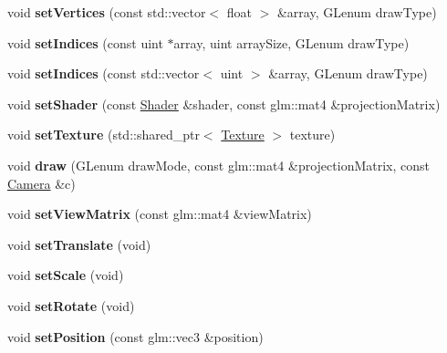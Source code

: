 \begin{DoxyCompactItemize}
void {\bfseries set\+Vertices} (const std\+::vector$<$ float $>$ \&array, G\+Lenum draw\+Type)
\item 
\mbox{\label{class_object_a84e6b296710f817596fa8ff7ad09d6ef}} 
void {\bfseries set\+Indices} (const uint $\ast$array, uint array\+Size, G\+Lenum draw\+Type)
\item 
\mbox{\label{class_object_a93b4e7330b5ccf3355fd53e202f5127c}} 
void {\bfseries set\+Indices} (const std\+::vector$<$ uint $>$ \&array, G\+Lenum draw\+Type)
\item 
\mbox{\label{class_object_ace74c7c5c63465778a46208f3f8aa708}} 
void {\bfseries set\+Shader} (const \hyperlink{class_shader}{Shader} \&shader, const glm\+::mat4 \&projection\+Matrix)
\item 
\mbox{\label{class_object_af1040cb216f7ca9db4c9578438949765}} 
void {\bfseries set\+Texture} (std\+::shared\+\_\+ptr$<$ \hyperlink{class_texture}{Texture} $>$ texture)
\item 
\mbox{\label{class_object_a15a01f840e0d23dcb531dc3e11db48c8}} 
void {\bfseries draw} (G\+Lenum draw\+Mode, const glm\+::mat4 \&projection\+Matrix, const \hyperlink{class_camera}{Camera} \&c)
\item 
\mbox{\label{class_object_ac9ec1252fbc5ed5f0e939327c49502df}} 
void {\bfseries set\+View\+Matrix} (const glm\+::mat4 \&view\+Matrix)
\item 
\mbox{\label{class_object_add03115634ae6d9b2e7b3f60b7e18fb7}} 
void {\bfseries set\+Translate} (void)
\item 
\mbox{\label{class_object_a47499992846ea51d38c619ed8198692d}} 
void {\bfseries set\+Scale} (void)
\item 
\mbox{\label{class_object_ae938828b5b801c7240f960612355eb0f}} 
void {\bfseries set\+Rotate} (void)
\item 
\mbox{\label{class_object_a05e1a120de109beb5bdd57dd137b1689}} 
void {\bfseries set\+Position} (const glm\+::vec3 \&position)
\item 

\end{DoxyCompactItemize}
